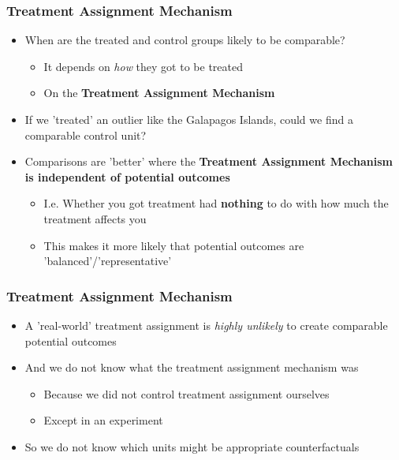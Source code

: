 \documentclass[xcolor=x11names,compress]{beamer}\usepackage[]{graphicx}\usepackage[]{xcolor}
\renewcommand{\(}{\begin{columns}}
\renewcommand{\)}{\end{columns}}
\newcommand{\<}[1]{\begin{column}{#1}}
\renewcommand{\>}{\end{column}}
\begin{document}
\begin{frame}
\frametitle{Treatment Assignment Mechanism}
\begin{itemize}
\item When are the treated and control groups likely to be comparable?
\pause
\begin{itemize}
\item It depends on \textit{how} they got to be treated
\pause
\item On the \textbf{Treatment Assignment Mechanism}
\pause
\end{itemize}
\item If we 'treated' an outlier like the Galapagos Islands, could we find a comparable control unit?
\pause
\item Comparisons are 'better' where the \textbf{Treatment Assignment Mechanism is independent of potential outcomes}
\pause
\begin{itemize}
\item I.e. Whether you got treatment had \textbf{nothing} to do with how much the treatment affects you 
\item This makes it more likely that potential outcomes are 'balanced'/'representative'
\end{itemize}
\end{itemize}
\end{frame}

\begin{frame}
\frametitle{Treatment Assignment Mechanism}
\begin{itemize}
\item A 'real-world' treatment assignment is \textit{highly unlikely} to create comparable potential outcomes
\pause
\item And we do not know what the treatment assignment mechanism was
\begin{itemize}
\item Because we did not control treatment assignment ourselves
\item Except in an experiment
\pause
\end{itemize}
\pause
\item So we do not know which units might be appropriate counterfactuals
\end{itemize}
\end{frame}
\end{document}
